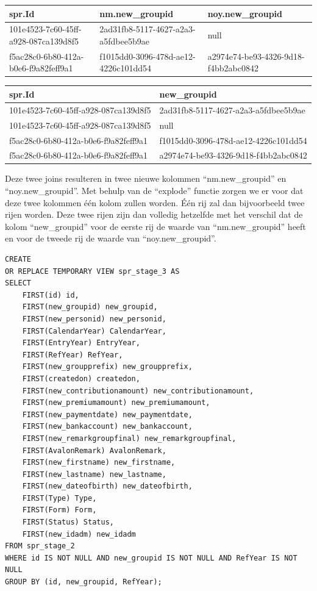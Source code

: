 \begin{center}%
    \begin{tabularx}{0.8\textwidth}{ |X|X|X| }
        \hline
        \textbf{spr.Id} & \textbf{nm.new\_groupid} & \textbf{noy.new\_groupid} \\
        \hline 
        101e4523-7c60-45ff-a928-087ca139d8f5  & 2ad31fb8-5117-4627-a2a3-a5fdbee5b9ae & null  \\
        \hline
        f5ac28c0-6b80-412a-b0e6-f9a82feff9a1 & f1015dd0-3096-478d-ae12-4226c101dd54 & a2974e74-be93-4326-9d18-f4bb2abc0842 \\
        \hline
    \end{tabularx}
    
    \Bigg\downarrow

    \begin{tabularx}{0.8\textwidth}{ |X|X| }
        \hline
        \textbf{spr.Id} & \textbf{new\_groupid} \\
        \hline 
        101e4523-7c60-45ff-a928-087ca139d8f5  & 2ad31fb8-5117-4627-a2a3-a5fdbee5b9ae  \\
        \hline
        101e4523-7c60-45ff-a928-087ca139d8f5  & null  \\
        \hline
        f5ac28c0-6b80-412a-b0e6-f9a82feff9a1 & f1015dd0-3096-478d-ae12-4226c101dd54 \\
        \hline
        f5ac28c0-6b80-412a-b0e6-f9a82feff9a1 & a2974e74-be93-4326-9d18-f4bb2abc0842 \\
        \hline
    \end{tabularx}
\end{center}

Deze twee joins resulteren in twee nieuwe kolommen ``nm.new\_groupid'' en ``noy.new\_groupid''. Met behulp van de ``explode'' functie zorgen we er voor dat deze twee kolommen één kolom zullen worden. Één rij zal dan bijvoorbeeld twee rijen worden. Deze twee rijen zijn dan volledig hetzelfde met het verschil dat de kolom ``new\_groupid'' voor de eerste rij de waarde van ``nm.new\_groupid'' heeft en voor de tweede rij de waarde van ``noy.new\_groupid''.


\begin{verbatim}
CREATE 
OR REPLACE TEMPORARY VIEW spr_stage_3 AS 
SELECT 
    FIRST(id) id, 
    FIRST(new_groupid) new_groupid, 
    FIRST(new_personid) new_personid,
    FIRST(CalendarYear) CalendarYear,
    FIRST(EntryYear) EntryYear,
    FIRST(RefYear) RefYear,
    FIRST(new_groupprefix) new_groupprefix,
    FIRST(createdon) createdon,
    FIRST(new_contributionamount) new_contributionamount,
    FIRST(new_premiumamount) new_premiumamount,
    FIRST(new_paymentdate) new_paymentdate,
    FIRST(new_bankaccount) new_bankaccount,
    FIRST(new_remarkgroupfinal) new_remarkgroupfinal,
    FIRST(AvalonRemark) AvalonRemark,
    FIRST(new_firstname) new_firstname,
    FIRST(new_lastname) new_lastname,
    FIRST(new_dateofbirth) new_dateofbirth,
    FIRST(Type) Type,
    FIRST(Form) Form,
    FIRST(Status) Status,
    FIRST(new_idadm) new_idadm
FROM spr_stage_2 
WHERE id IS NOT NULL AND new_groupid IS NOT NULL AND RefYear IS NOT NULL
GROUP BY (id, new_groupid, RefYear);
\end{verbatim}

